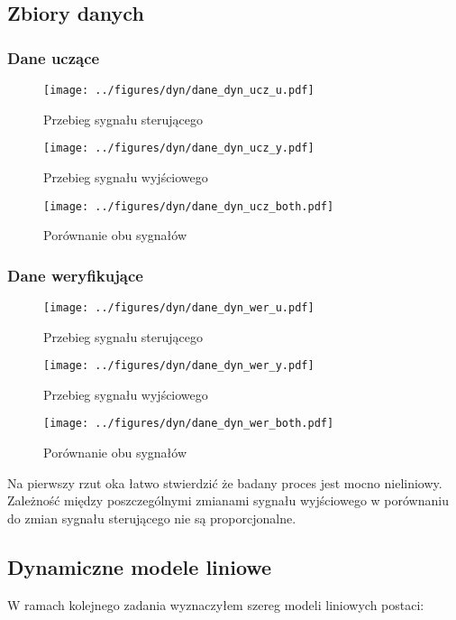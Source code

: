 \documentclass[a4paper,titlepage,11pt,floatssmall]{mwrep}
\begin{document}
\subsection{Zbiory danych}
\subsubsection{Dane uczące}
\bigskip
\begin{figure}[H]
\centering
\texttt{[image: ../figures/dyn/dane\_dyn\_ucz\_u.pdf]}
\caption{Przebieg sygnału sterującego}
\end{figure}
\newpage

\begin{figure}[H]
\centering
\texttt{[image: ../figures/dyn/dane\_dyn\_ucz\_y.pdf]}
\caption{Przebieg sygnału wyjściowego}
\end{figure}

\begin{figure}[H]
\centering
\texttt{[image: ../figures/dyn/dane\_dyn\_ucz\_both.pdf]}
\caption{Porównanie obu sygnałów}
\end{figure}

\subsubsection{Dane weryfikujące}
\begin{figure}[H]
\centering
\texttt{[image: ../figures/dyn/dane\_dyn\_wer\_u.pdf]}
\caption{Przebieg sygnału sterującego}
\end{figure}

\begin{figure}[H]
\centering
\texttt{[image: ../figures/dyn/dane\_dyn\_wer\_y.pdf]}
\caption{Przebieg sygnału wyjściowego}
\end{figure}

\begin{figure}[H]
\centering
\texttt{[image: ../figures/dyn/dane\_dyn\_wer\_both.pdf]}
\caption{Porównanie obu sygnałów}
\end{figure}

Na pierwszy rzut oka łatwo stwierdzić że badany proces jest mocno nieliniowy. Zależność między poszczególnymi zmianami sygnału wyjściowego w porównaniu do zmian sygnału sterującego nie są proporcjonalne.  

\subsection{Dynamiczne modele liniowe}
W ramach kolejnego zadania wyznaczyłem szereg modeli liniowych postaci:
\end{document}

